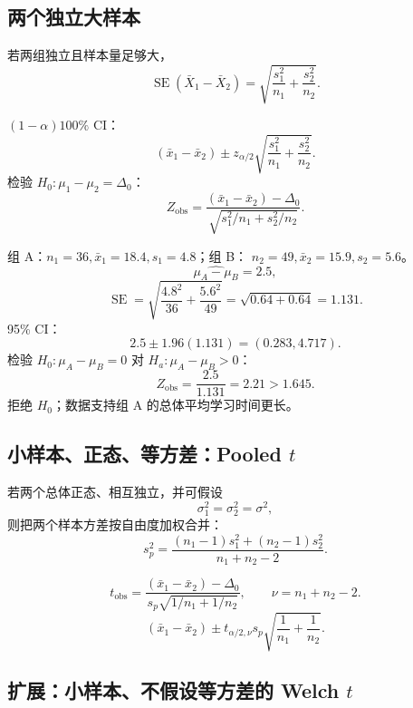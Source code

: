 \documentclass[11pt,a4paper]{article}
\newcommand{\SE}{\operatorname{SE}}
\newcommand{\1}{\mathbf{1}}
\begin{document}
\subsection{两个独立大样本}

若两组独立且样本量足够大，
\[
  \SE(\bar X_1-\bar X_2)
  =
  \sqrt{\frac{s_1^2}{n_1}+\frac{s_2^2}{n_2}}.
\]

\begin{memorybox}[两个独立大样本均值]
$(1-\alpha)100\%$ CI：
\[
  \boxed{
  (\bar x_1-\bar x_2)
  \pm
  z_{\alpha/2}
  \sqrt{\frac{s_1^2}{n_1}+\frac{s_2^2}{n_2}}.
  }
\]
检验 $H_0:\mu_1-\mu_2=\Delta_0$：
\[
  \boxed{
  Z_{\mathrm{obs}}
  =
  \frac{(\bar x_1-\bar x_2)-\Delta_0}
  {\sqrt{s_1^2/n_1+s_2^2/n_2}}.
  }
\]
\end{memorybox}

\begin{examplebox}[两个独立大样本]
组 A：$n_1=36,\bar x_1=18.4,s_1=4.8$；组 B：
$n_2=49,\bar x_2=15.9,s_2=5.6$。
\[
  \widehat{\mu_A-\mu_B}=2.5,
\]
\[
  \SE
  =
  \sqrt{\frac{4.8^2}{36}+\frac{5.6^2}{49}}
  =
  \sqrt{0.64+0.64}
  =
  1.131.
\]
95\% CI：
\[
  2.5\pm1.96(1.131)
  =
  (0.283,4.717).
\]
检验 $H_0:\mu_A-\mu_B=0$ 对 $H_a:\mu_A-\mu_B>0$：
\[
  Z_{\mathrm{obs}}=\frac{2.5}{1.131}=2.21>1.645.
\]
拒绝 $H_0$；数据支持组 A 的总体平均学习时间更长。
\end{examplebox}

\subsection{\texorpdfstring{小样本、正态、等方差：Pooled $t$}{小样本、正态、等方差：Pooled t}}

若两个总体正态、相互独立，并可假设
\[
  \sigma_1^2=\sigma_2^2=\sigma^2,
\]
则把两个样本方差按自由度加权合并：
\[
  \boxed{
  s_p^2
  =
  \frac{(n_1-1)s_1^2+(n_2-1)s_2^2}{n_1+n_2-2}.
  }
\]

\begin{memorybox}
\[
  \boxed{
  t_{\mathrm{obs}}
  =
  \frac{(\bar x_1-\bar x_2)-\Delta_0}
  {s_p\sqrt{1/n_1+1/n_2}},
  \qquad
  \nu=n_1+n_2-2.
  }
\]
\[
  \boxed{
  (\bar x_1-\bar x_2)
  \pm
  t_{\alpha/2,\nu}
  s_p\sqrt{\frac1{n_1}+\frac1{n_2}}.
  }
\]
\end{memorybox}

\subsection{\texorpdfstring{扩展：小样本、不假设等方差的 Welch $t$}{扩展：小样本、不假设等方差的 Welch t}}
\end{document}
